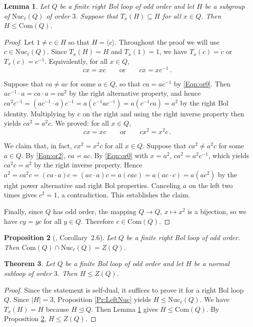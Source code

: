 \documentclass[12pt,reqno]{amsart}
\numberwithin{equation}{section}
\theoremstyle{plain}
\newtheorem{theorem}{Theorem}[section]
\newtheorem{lemma}[theorem]{Lemma}
\newtheorem{proposition}[theorem]{Proposition}
\theoremstyle{definition}
\newcommand{\inv}{^{-1}}
\newcommand{\lnuc}[1]{\mathrm{Nuc}_\ell(#1)}
\newcommand{\com}[1]{\mathrm{Com}(#1)}
\begin{document}
\begin{lemma}\label{Lem:rnuccomm}
Let $Q$ be a finite right Bol loop of odd order and let $H$ be a subgroup of $\lnuc{Q}$ of order $3$. Suppose that $T_x(H)\subseteq H$ for all $x\in Q$. Then $H\leq \com{Q}$.
\end{lemma}
\begin{proof}
Let $1\ne c\in H$ so that $H = \langle c\rangle$. Throughout the proof we will use $c\in\lnuc{Q}$. Since $T_x(H)=H$ and $T_x(1)=1$, we have $T_x(c) = c$ or $T_x(c) = c\inv$. Equivalently, for all $x\in Q$,
\begin{equation}\label{Eqn:or0}
	cx = xc\qquad\text{or}\qquad cx=xc\inv\,.
\end{equation}

Suppose that $ca\neq ac$ for some $a\in Q$, so that $ca=ac\inv$ by \eqref{Eqn:or0}. Then $ac\inv\cdot a = ca\cdot a = ca^2$ by the right alternative property, and hence $ca^2c\inv = (ac\inv\cdot a)c\inv = a(c\inv ac\inv) = a(c\inv ca) = a^2$ by the right Bol identity. Multiplying by $c$ on the right and using the right inverse property then yields $ca^2=a^2c$. We proved: for all $x\in Q$,
\begin{equation}\label{Eqn:or2}
 	cx = xc \qquad\text{or}\qquad cx^2 = x^2 c\,.
\end{equation}

We claim that, in fact, $cx^2=x^2c$ for all $x\in Q$. Suppose that $ca^2\ne a^2c$ for some $a\in Q$. By \eqref{Eqn:or2}, $ca=ac$. By \eqref{Eqn:or0} with $x=a^2$, $ca^2=a^2c^{-1}$, which yields $ca^2c=a^2$ by the right inverse property. Hence $a^2 = ca^2c = (ca\cdot a)c = (ac\cdot a)c = a(cac) = a(ac\cdot c) = a(ac^2)$ by the right power alternative and right Bol properties. Canceling $a$ on the left two times gives $c^2=1$, a contradiction. This establishes the claim.

Finally, since $Q$ has odd order, the mapping $Q\to Q$, $x\mapsto x^2$ is a bijection, so we have $cy = yc$ for all $y\in Q$. Therefore $c\in \com{Q}$.
\end{proof}

\begin{proposition}[\cite{KPV_comm}, Corollary~2.6]\label{Prp:KPV_comm}
Let $Q$ be a finite right Bol loop of odd order. Then $\com{Q}\cap \lnuc{Q} = Z(Q)$.
\end{proposition}

\begin{theorem}\label{Thm:centralsubloop}
 Let $Q$ be a finite Bol loop of odd order and let $H$ be a normal subloop of order $3$. Then $H\leq Z(Q)$.
\end{theorem}
\begin{proof}
Since the statement is self-dual, it suffices to prove it for a right Bol loop $Q$. Since $|H|=3$, Proposition \ref{Pr:LeftNuc} yields $H\leq \lnuc{Q}$.  We have $T_x(H)=H$ because $H\unlhd Q$. Then Lemma \ref{Lem:rnuccomm} gives $H\leq \com{Q}$. By Proposition \ref{Prp:KPV_comm}, $H\leq Z(Q)$.
\end{proof}
\end{document}
